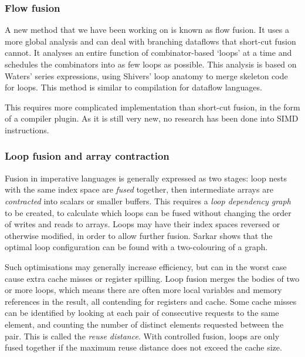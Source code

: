 \subsubsection{Flow fusion}

A new method that we have been working on is known as flow fusion\cite{lippmeier2013flow}.
It uses a more global analysis and can deal with branching dataflows that short-cut fusion cannot.
It analyses an entire function of combinator-based `loops' at a time and schedules the combinators into as few loops as possible.
This analysis is based on Waters' series expressions\cite{waters1991automatic}, using Shivers' loop anatomy\cite{shivers2005anatomy} to merge skeleton code for loops.
This method is similar to compilation for dataflow languages\cite{johnston2004advances}.

This requires more complicated implementation than short-cut fusion, in the form of a compiler plugin.
As it is still very new, no research has been done into SIMD instructions.


\subsubsection{Loop fusion and array contraction}

Fusion in imperative languages is generally expressed as two stages:
loop nests with the same index space are \emph{fused} together,
then intermediate arrays are \emph{contracted} into scalars or smaller buffers.
This requires a \emph{loop dependency graph}\cite{gao1993collective} to be created,
to calculate which loops can be fused without changing the order of writes and reads to arrays.
Loops may have their index spaces reversed or otherwise modified, in order to allow further fusion.
Sarkar shows that the optimal loop configuration can be found with a two-colouring of a graph\cite{sarkar1991optimization}.

Such optimisations may generally increase efficiency, but can in the worst case cause extra cache misses or register spilling.
Loop fusion merges the bodies of two or more loops, which means there are often more local variables
and memory references in the result, all contending for registers and cache.
Some cache misses can be identified by looking at each pair of consecutive requests to the same element, and counting the number of distinct elements requested between the pair.
This is called the \emph{reuse distance}\cite{song2004improving}.
With controlled fusion, loops are only fused together if the maximum reuse distance does not exceed the cache size. 

